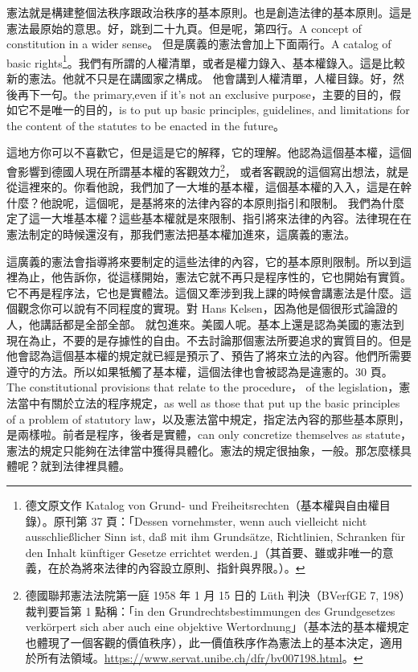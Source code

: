 \hypertarget{w05:cue:105}{}憲法就是構建整個法秩序跟政治秩序的基本原則。也是創造法律的基本原則。這是憲法最原始的意思。好，跳到二十九頁。但是呢，第四行。A concept of constitution in a wider sense。
\hypertarget{w05:cue:106}{}但是廣義的憲法會加上下面兩行。A catalog of basic rights\footnote{德文原文作 Katalog von Grund- und Freiheitsrechten（基本權與自由權目錄）。原刊第 37 頁：「Dessen vornehmster, wenn auch vielleicht nicht ausschließlicher Sinn ist, daß mit ihm Grundsätze, Richtlinien, Schranken für den Inhalt künftiger Gesetze errichtet werden.」（其首要、雖或非唯一的意義，在於為將來法律的內容設立原則、指針與界限。）\cite[37]{kelsen1929}。}。我們有所謂的人權清單，或者是權力錄入、基本權錄入。這是比較新的憲法。他就不只是在講國家之構成。
\hypertarget{w05:cue:107}{}他會講到人權清單，人權目錄。好，然後再下一句。the primary,even if it's not an exclusive purpose，主要的目的，假如它不是唯一的目的，is to put up basic principles, guidelines, and limitations for the content of the statutes to be enacted in the future。

\hypertarget{w05:cue:108}{}這地方你可以不喜歡它，但是這是它的解釋，它的理解。他認為這個基本權，這個會影響到德國人現在所謂基本權的客觀效力\footnote{德國聯邦憲法法院第一庭 1958 年 1 月 15 日的 Lüth 判決（BVerfGE 7, 198）裁判要旨第 1 點稱：「in den Grundrechtsbestimmungen des Grundgesetzes verkörpert sich aber auch eine objektive Wertordnung」（基本法的基本權規定也體現了一個客觀的價值秩序），此一價值秩序作為憲法上的基本決定，適用於所有法領域。\url{https://www.servat.unibe.ch/dfr/bv007198.html}。}，
\hypertarget{w05:cue:109}{}或者客觀說的這個寫出想法，就是從這裡來的。你看他說，我們加了一大堆的基本權，這個基本權的入入，這是在幹什麼？他說呢，這個呢，是基將來的法律內容的本原則指引和限制。
\hypertarget{w05:cue:110}{}我們為什麼定了這一大堆基本權？這些基本權就是來限制、指引將來法律的內容。法律現在在憲法制定的時候還沒有，那我們憲法把基本權加進來，這廣義的憲法。

\hypertarget{w05:cue:111}{}這廣義的憲法會指導將來要制定的這些法律的內容，它的基本原則限制。所以到這裡為止，他告訴你，從這樣開始，憲法它就不再只是程序性的，它也開始有實質。它不再是程序法，它也是實體法。這個又牽涉到我上課的時候會講憲法是什麼。這個觀念你可以說有不同程度的實現。對 Hans Kelsen，因為他是個很形式論證的人，他講話都是全部全部。
\hypertarget{w05:cue:112}{}就包進來。美國人呢。基本上還是認為美國的憲法到現在為止，不要的是存據性的自由。不去討論那個憲法所要追求的實質目的。但是他會認為這個基本權的規定就已經是預示了、預告了將來立法的內容。他們所需要遵守的方法。所以如果牴觸了基本權，這個法律也會被認為是違憲的。30 頁。The constitutional provisions that relate to the procedure，
\hypertarget{w05:cue:113}{}of the legislation，憲法當中有關於立法的程序規定，as well as those that put up the basic principles of a problem of statutory law，以及憲法當中規定，指定法內容的那些基本原則，是兩樣啦。前者是程序，後者是實體，can only concretize themselves as statute，憲法的規定只能夠在法律當中獲得具體化。憲法的規定很抽象，一般。那怎麼樣具體呢？就到法律裡具體。

